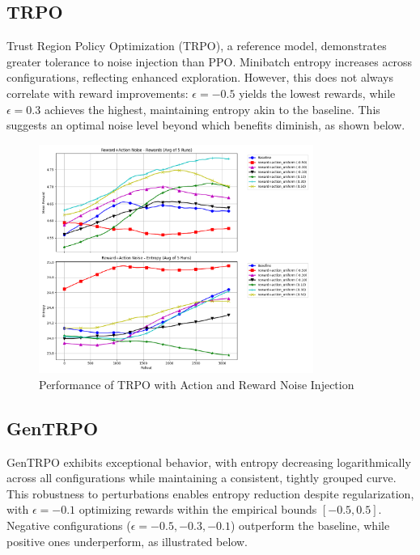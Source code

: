 \documentclass{svproc}
\begin{document}
\subsection{TRPO}

Trust Region Policy Optimization (TRPO), a reference model, demonstrates greater tolerance to noise injection than PPO. Minibatch entropy increases across configurations, reflecting enhanced exploration. However, this does not always correlate with reward improvements: \(\epsilon = -0.5\) yields the lowest rewards, while \(\epsilon = 0.3\) achieves the highest, maintaining entropy akin to the baseline. This suggests an optimal noise level beyond which benefits diminish, as shown below.

\vspace*{-\baselineskip}
\begin{figure}[H]
    \centering
    \includegraphics[width=0.8\textwidth]{.assets/TRPO_100000_reward_action_5_runs_resmoothed.png}
    \caption{Performance of TRPO with Action and Reward Noise Injection}
\end{figure}
\vspace*{-\baselineskip}

\subsection{GenTRPO}

GenTRPO exhibits exceptional behavior, with entropy decreasing logarithmically across all configurations while maintaining a consistent, tightly grouped curve. This robustness to perturbations enables entropy reduction despite regularization, with \(\epsilon = -0.1\) optimizing rewards within the empirical bounds \([-0.5, 0.5]\). Negative configurations (\(\epsilon = -0.5, -0.3, -0.1\)) outperform the baseline, while positive ones underperform, as illustrated below.
\end{document}
